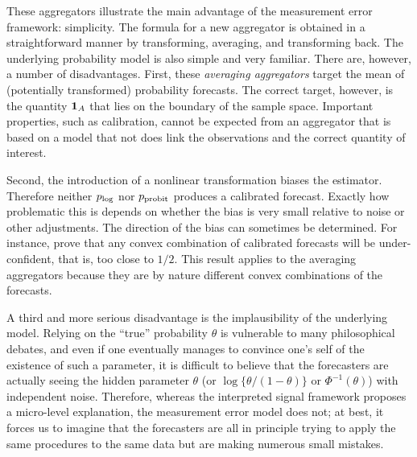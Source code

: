 \documentclass[11pt]{article}
\theoremstyle{definition}
\theoremstyle{definition}
\def\one{{\bf 1}}
\def\probit{p_{\rm probit}}
\def\plog{p_{\rm log}}
\begin{document}
These aggregators illustrate the main advantage of the measurement
error framework: simplicity.  The formula for a new aggregator is
obtained in a straightforward manner by transforming, averaging, and
transforming back.  The underlying probability model is also simple
and very familiar.  There are, however, a number of disadvantages.
First, these \textit{averaging aggregators} target the mean of
(potentially transformed) probability forecasts. The correct target,
however, is the quantity $\one_A$ that lies on the boundary of
the sample space. Important properties, such as calibration, cannot be
expected from an aggregator that is based on a model that not does link the observations and the correct quantity
of interest.

Second, the introduction of a nonlinear transformation biases the
estimator.  Therefore neither $\plog$ nor $\probit$ produces a
calibrated forecast. Exactly how problematic this is depends on
whether the bias is very small relative to noise or other
adjustments.  The direction of the bias can sometimes be
determined. For instance, \citet{Ranjan08} prove that any convex
combination of calibrated forecasts will be under-confident, that is,
too close to $1/2$. This result applies to the averaging aggregators
because they are by nature different convex combinations of the
forecasts.

A third and more serious disadvantage is the implausibility of the
underlying model. Relying on the ``true'' probability $\theta$ is vulnerable to
many philosophical debates, and even if one eventually manages to
convince one's self of the existence of such a parameter, it is
difficult to believe that the forecasters are actually seeing the
hidden parameter $\theta$ (or $\log\{\theta/(1-\theta)\}$ or
$\Phi^{-1}(\theta)$) with independent noise. Therefore, whereas the
interpreted signal framework proposes a micro-level explanation, the
measurement error model does not; at best, it forces us to imagine that
the forecasters are all in principle trying to apply the same
procedures to the same data but are making numerous small mistakes.
\end{document}
